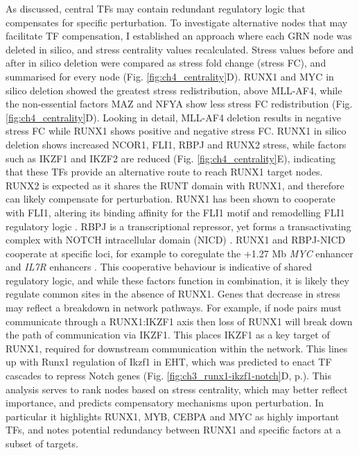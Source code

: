 As discussed, central TFs may contain redundant regulatory logic that compensates for specific perturbation. To investigate alternative nodes that may facilitate TF compensation, I established an approach where each GRN node was deleted in silico, and stress centrality values recalculated. Stress values before and after in silico deletion were compared as stress fold change (stress FC), and summarised for every node (Fig. \ref{fig:ch4_centrality}D). RUNX1 and MYC in silico deletion showed the greatest stress redistribution, above MLL-AF4, while the non-essential factors MAZ and NFYA show less stress FC redistribution (Fig. \ref{fig:ch4_centrality}D). Looking in detail, MLL-AF4 deletion results in negative stress FC while RUNX1 shows positive and negative stress FC. RUNX1 in silico deletion shows increased NCOR1, FLI1, RBPJ and RUNX2 stress, while factors such as IKZF1 and IKZF2 are reduced (Fig. \ref{fig:ch4_centrality}E), indicating that these TFs provide an alternative route to reach RUNX1 target nodes. RUNX2 is expected as it shares the RUNT domain with RUNX1, and therefore can likely compensate for perturbation. RUNX1 has been shown to cooperate with FLI1, altering its binding affinity for the FLI1 motif and remodelling FLI1 regulatory logic \citep{gilmour_co-operation_2018, lichtinger_runx1_2012}. RBPJ is a transcriptional repressor, yet forms a transactivating complex with NOTCH intracellular domain (NICD) \citep{kojika_notch_2001}. RUNX1 and RBPJ-NICD cooperate at specific loci, for example to coregulate the +1.27 Mb \textit{MYC} enhancer and \textit{IL7R} enhancers \citep{choi_runx1_2017, wang_notch1-rbpj_2014}. This cooperative behaviour is indicative of shared regulatory logic, and while these factors function in combination, it is likely they regulate common sites in the absence of RUNX1. Genes that decrease in stress may reflect a breakdown in network pathways. For example, if node pairs must communicate through a RUNX1:IKZF1 axis then loss of RUNX1 will break down the path of communication via IKZF1. This places IKZF1 as a key target of RUNX1, required for downstream communication within the network. This lines up with Runx1 regulation of Ikzf1 in EHT, which was predicted to enact TF cascades to repress Notch genes (Fig. \ref{fig:ch3_runx1-ikzf1-notch}D, p.\pageref{fig:ch3_runx1-ikzf1-notch}). This analysis serves to rank nodes based on stress centrality, which may better reflect importance, and predicts compensatory mechanisms upon perturbation. In particular it highlights RUNX1, MYB, CEBPA and MYC as highly important TFs, and notes potential redundancy between RUNX1 and specific factors at a subset of targets. 

